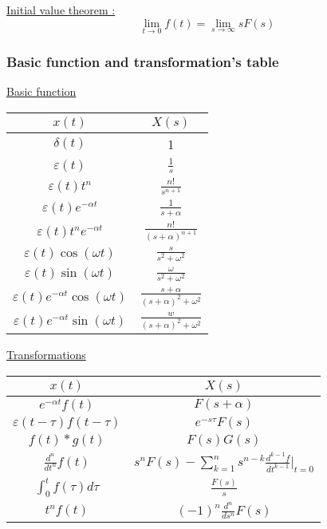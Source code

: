 \documentclass[../main.tex]{subfiles}
\begin{document}
\quad \underline{Initial value theorem :}\\
\begin{equation}
    \lim_{t\rightarrow 0} f(t) = \lim_{s\rightarrow \infty} sF(s)
\end{equation}

\subsubsection{Basic function and transformation's table}
\quad \underline{Basic function}
\begin{table}[hbt!]
    \centering
    \begin{tabular}{c|c}
        $x(t)$ & $X(s)$ \\
        \hline
        $\delta(t)$ & 1\\
        $\varepsilon(t)$ & $\frac{1}{s}$\\
        $\varepsilon(t)t^n$ & $\frac{n!}{s^{n+1}}$\\
        $\varepsilon(t) e^{-\alpha t}$ & $\frac{1}{s+\alpha}$\\
        $\varepsilon(t)t^n e^{-\alpha t}$ & $\frac{n!}{(s+\alpha)^{n+1}}$\\
        $\varepsilon(t)\cos(\omega t)$ & $\frac{s}{s^2 + \omega^2}$\\
        $\varepsilon(t)\sin(\omega t)$ & $\frac{\omega}{s^2+\omega^2}$\\
        $\varepsilon(t) e^{-\alpha t} \cos(\omega t)$ & $\frac{s+\alpha}{(s+\alpha)^2+\omega^2}$\\
        $\varepsilon(t) e^{-\alpha t} \sin(\omega t)$ & $\frac{w}{(s+\alpha)^2 + \omega^2}$\\
    \end{tabular}
\end{table}

\quad \underline{Transformations}
\begin{table}[hbt!]
    \centering
    \begin{tabular}{c|c}
        $x(t)$ & $X(s)$ \\
         \hline
        $e^{-\alpha t} f(t)$ & $F(s+\alpha)$\\
        $\varepsilon(t-\tau) f(t-\tau)$ & $e^{-s\tau} F(s)$\\
        $f(t)*g(t)$ & $F(s)G(s)$\\
        $\frac{d^n}{dt^n}f(t)$ & $s^n F(s) - \sum_{k=1}^n s^{n-k} \frac{d^{k-1} f}{dt^{k-1}}\rvert_{t=0}$\\
        $\int_0^t f(\tau)d\tau$ & $\frac{F(s)}{s}$\\
        $t^nf(t)$ & $(-1)^n \frac{d^n}{ds^n}F(s)$\\
    \end{tabular}
\end{table}
\end{document}
